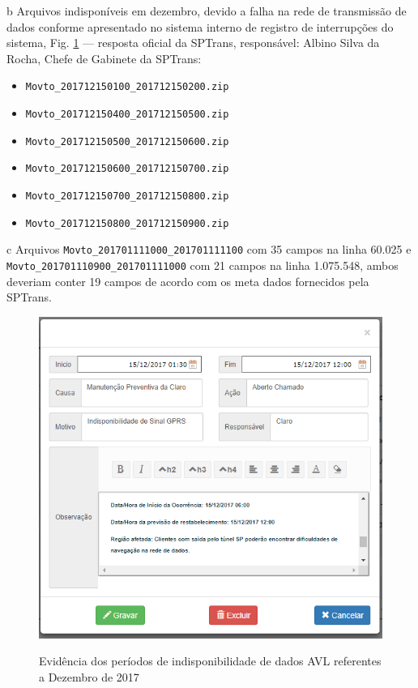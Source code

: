 \documentclass[
	12pt,				%
	oneside,			%
	a4paper,			%
	english,			%
	brazil				%
	]{abntex2ppgsi}
\begin{document}
{{\begin{table}[!htb]
\begin{threeparttable}
\begin{tablenotes}
\item[b]Arquivos indisponíveis em dezembro, devido a falha na rede de transmissão de dados conforme apresentado no sistema interno de registro de interrupções do sistema, Fig. \ref{fig:e_sic_33310} --- resposta oficial da SPTrans, responsável: Albino Silva da Rocha, Chefe de Gabinete da SPTrans: 
\begin{itemize}
\item \texttt{Movto\_201712150100\_201712150200.zip}
\item \texttt{Movto\_201712150400\_201712150500.zip}
\item \texttt{Movto\_201712150500\_201712150600.zip}
\item \texttt{Movto\_201712150600\_201712150700.zip}
\item \texttt{Movto\_201712150700\_201712150800.zip}
\item \texttt{Movto\_201712150800\_201712150900.zip}
\end{itemize}
\item[c] Arquivos  \texttt{Movto\_201701111000\_201701111100} com 35 campos na linha 60.025 e \texttt{Movto\_201701110900\_201701111000} com 21 campos na linha 1.075.548, ambos deveriam conter 19 campos de acordo com os meta dados fornecidos pela SPTrans.
\end{tablenotes}
\end{threeparttable}
\end{table}

\begin{figure}[!htb]%
	\centering
 	  \caption{Evidência dos períodos de indisponibilidade de dados AVL referentes a Dezembro de 2017}
		\includegraphics[width=0.5\linewidth]{images/33310_ANEXO_E_SIC_33310.png}
	\label{fig:e_sic_33310}
\end{figure}

}}
\end{document}
